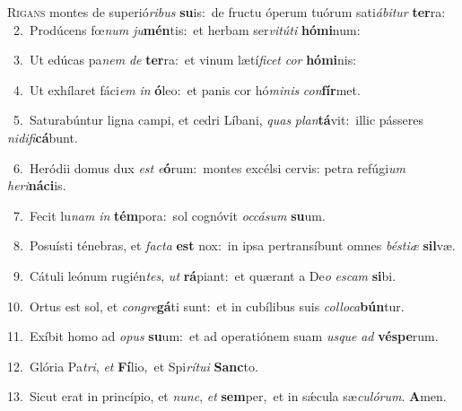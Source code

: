 \lettrine{\initial\textcolor{\initialcolor}{R}}{igans} montes de superió\-\textit{ri}\-\textit{bus} \textbf{su}\-is:~\star de fructu óperum tuórum sati\-\textit{á}\-\textit{bi}\textit{tur} \textbf{ter}\-ra:\\
{\numbfont\textcolor{\numbcolor}{~2.}}~Prodúcens fœ\textit{num} \textit{ju}\-\textbf{mén}tis:~\star et herbam ser\-\textit{vi}\-\textit{tú}\textit{ti} \textbf{hó}\-\textbf{mi}num:\par
{\numbfont\textcolor{\numbcolor}{~3.}}~Ut edúcas pa\textit{nem} \textit{de} \textbf{ter}\-ra:~\star et vinum lætí\-\textit{fi}\-\textit{cet} \textit{cor} \textbf{hó}\-\textbf{mi}nis:\par
{\numbfont\textcolor{\numbcolor}{~4.}}~Ut exhílaret fáci\textit{em} \textit{in} \textbf{ó}\-leo:~\star et panis cor hó\-\textit{mi}\-\textit{nis} \textit{con}\-\textbf{fír}met.\par
{\numbfont\textcolor{\numbcolor}{~5.}}~Saturabúntur ligna campi, et cedri Líbani, \textit{quas} \textit{plan}\-\textbf{tá}vit:~\star illic pásseres \textit{ni}\-\textit{di}\textit{fi}\textbf{cá}bunt.\par
{\numbfont\textcolor{\numbcolor}{~6.}}~Heródii domus dux \textit{est} \textit{e}\-\textbf{ó}rum:~\star montes excélsi cervis: petra refúgi\textit{um} \textit{he}\-\textit{ri}\textbf{ná}\textbf{ci}is.\par
{\numbfont\textcolor{\numbcolor}{~7.}}~Fecit lu\textit{nam} \textit{in} \textbf{tém}\-pora:~\star sol cognóvit \textit{oc}\-\textit{cá}\textit{sum} \textbf{su}\-um.\par
{\numbfont\textcolor{\numbcolor}{~8.}}~Posuísti ténebras, et \textit{fac}\-\textit{ta} \textbf{est} nox:~\star in ipsa pertransíbunt omnes \textit{bés}\-\textit{ti}\textit{æ} \textbf{sil}\-væ.\par
{\numbfont\textcolor{\numbcolor}{~9.}}~Cátuli leónum rugién\-\textit{tes}\-, \textit{ut} \textbf{rá}\-piant:~\star et quærant a De\textit{o} \textit{es}\-\textit{cam} \textbf{si}\-bi.\par
{\numbfont\textcolor{\numbcolor}{10.}}~Ortus est sol, et \textit{con}\-\textit{gre}\textbf{gá}ti sunt:~\star et in cubílibus suis \textit{col}\-\textit{lo}\textit{ca}\textbf{bún}tur.\par
{\numbfont\textcolor{\numbcolor}{11.}}~Exíbit homo ad \textit{o}\-\textit{pus} \textbf{su}\-um:~\star et ad operatiónem suam \textit{us}\-\textit{que} \textit{ad} \textbf{vés}\-\textbf{pe}rum.\par
{\numbfont\textcolor{\numbcolor}{12.}}~Glória Pa\-\textit{tri}\-, \textit{et} \textbf{Fí}\-lio,~\star et Spi\-\textit{rí}\-\textit{tu}\textit{i} \textbf{Sanc}\-to.\par
{\numbfont\textcolor{\numbcolor}{13.}}~Sicut erat in princípio, et \textit{nunc}\-, \textit{et} \textbf{sem}\-per,~\star et in sǽcula sæ\-\textit{cu}\-\textit{ló}\textit{rum}. \textbf{A}\-men.\par
